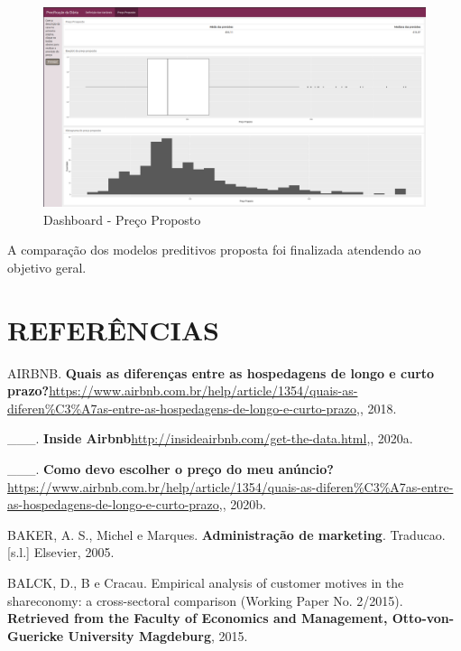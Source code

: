 \documentclass[
	12pt,				%
	a4paper,		%
	oneside,    %
	chapter=TITLE,		   %
	section=TITLE,		   %
	subsection=TITLE,	   %
	subsubsection=TITLE, %
	english,			%
	french,				%
	spanish,			%
	brazil,				%
]{abntex2}
\begin{document}
\begin{figure}
\centering
\includegraphics[width=\textwidth,height=0.3\textheight]{../fig/dash2.png}
\caption{Dashboard - Preço Proposto\label{fig:dash2}}
\end{figure}

A comparação dos modelos preditivos proposta foi finalizada atendendo ao
objetivo geral.

\newpage

\hypertarget{referuxeancias}{%
\chapter*{REFERÊNCIAS}\label{referuxeancias}}

\hypertarget{refs}{}
\leavevmode\hypertarget{ref-airbnbperiodolongo}{}%
AIRBNB. \textbf{Quais as diferenças entre as hospedagens de longo e
curto
prazo?}\url{https://www.airbnb.com.br/help/article/1354/quais-as-diferen\%C3\%A7as-entre-as-hospedagens-de-longo-e-curto-prazo},,
2018.

\leavevmode\hypertarget{ref-inside}{}%
\_\_\_. \textbf{Inside
Airbnb}\url{http://insideairbnb.com/get-the-data.html},, 2020a.

\leavevmode\hypertarget{ref-precoairbnb}{}%
\_\_\_. \textbf{Como devo escolher o preço do meu
anúncio?}\url{https://www.airbnb.com.br/help/article/1354/quais-as-diferen\%C3\%A7as-entre-as-hospedagens-de-longo-e-curto-prazo},,
2020b.

\leavevmode\hypertarget{ref-baker2005administraccao}{}%
BAKER, A. S., Michel e Marques. \textbf{Administração de marketing}.
Traducao. {[}s.l.{]} Elsevier, 2005.

\leavevmode\hypertarget{ref-balck2015empirical}{}%
BALCK, D., B e Cracau. Empirical analysis of customer motives in the
shareconomy: a cross-sectoral comparison (Working Paper No. 2/2015).
\textbf{Retrieved from the Faculty of Economics and Management,
Otto-von-Guericke University Magdeburg}, 2015.
\end{document}
